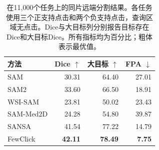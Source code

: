 \begin{table}[t]
\centering
\caption{在11,000个任务上的同片远端分割结果。各任务使用三个正支持点击和两个负支持点击，查询区域无点击。Dice与大目标列分别报告目标存在Dice和大目标Dice。所有指标均为百分比；粗体表示最优值。}
\label{tab:remote}
\small
\setlength{\tabcolsep}{4pt}
\begin{tabular}{@{}lrrr@{}}
\toprule
方法 & Dice $\uparrow$ & 大目标 $\uparrow$ & FPA $\downarrow$ \\
\midrule
SAM & 30.31 & 64.40 & 27.01 \\
SAM2 & 33.60 & 66.50 & 18.91 \\
WSI-SAM & 23.81 & 50.02 & 23.43 \\
SAM-Med2D & 24.28 & 54.80 & 39.87 \\
SANSA & 41.54 & 77.22 & 14.79 \\
FewClick & \textbf{42.11} & \textbf{78.49} & \textbf{7.75} \\
\bottomrule
\end{tabular}
\end{table}
